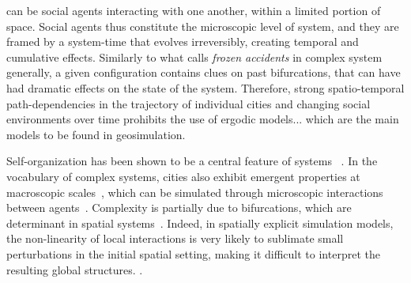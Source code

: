 \documentclass[3p,times,procedia]{elsarticle}
\begin{document}
 can be  social agents interacting with one another, within a limited portion of space. Social agents thus constitute the microscopic level of  system, and they are framed by a system-time that evolves irreversibly, creating temporal and cumulative effects. Similarly to what \citet{gell1995quark} calls \emph{frozen accidents} in complex system generally, a given configuration contains clues on past bifurcations, that can have had dramatic effects on the state of the system. Therefore, strong spatio-temporal path-dependencies in the trajectory of individual cities and changing social environments over time prohibits the use of ergodic models... which are the main models to be found in geosimulation.


Self-organization has been shown to be a central feature of  systems  ~\citep{AllenSanglier1981,saint1989villes, Portugali2000}. In the vocabulary of complex systems, cities also exhibit emergent properties at macroscopic scales~\citep{pumain2006hierarchy, AzizAlaouiBertelle2009}, which can be simulated through microscopic interactions between agents~\citep{Wu2002, Batty2007}. Complexity is partially due to bifurcations, which are determinant in spatial systems~\citep{Wilson1981, Wilson2002}. Indeed, in spatially explicit simulation models, the non-linearity of local interactions is very likely to sublimate small perturbations in the initial spatial setting, making it difficult to interpret the resulting global structures. . \\

\end{document}

